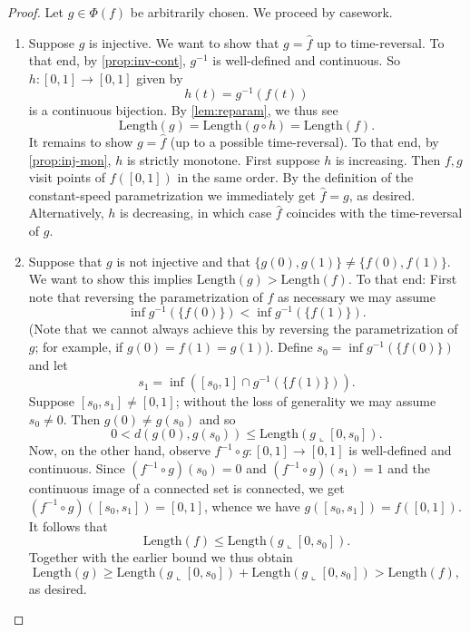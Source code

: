 \documentclass[aos, preprint]{imsart}
\theoremstyle{plain}
\theoremstyle{remark}
\begin{document}
\begin{appendix}
\begin{proof}
  Let $g \in \Phi(f)$ be arbitrarily chosen.
  We proceed
  by casework.
  \begin{enumerate}
    \item Suppose $g$ is injective. We want to show that $g = \hat{f}$ up to time-reversal. To
      that end, by \cref{prop:inv-cont}, $g^{-1}$ is well-defined and
      continuous. So $h : [0,1] \to [0,1]$ given by
      \[
      h(t) = g^{-1}(f(t))
      \]
      is a continuous bijection. By \cref{lem:reparam}, we thus see
      \[
      \mathrm{Length}(g) = \mathrm{Length}(g \circ h) =
      \mathrm{Length}(f).
      \]
      It remains to show $g = \hat{f}$ (up to a possible time-reversal). To
      that end, by \cref{prop:inj-mon}, $h$ is strictly monotone.
      First suppose $h$ is increasing. Then
      $f,g$ visit points of $f([0,1])$ in the same order. By the
      definition of the constant-speed parametrization we immediately get
      $\hat{f} = g$, as desired. Alternatively, $h$ is decreasing, in which case $\hat{f}$ coincides with the time-reversal of $g$.
    \item Suppose that $g$ is not injective and that $\{g(0), g(1)\}
      \neq \{f(0), f(1)\}$. We want to show this implies
      $\mathrm{Length}(g) > \mathrm{Length}(f)$. To that end: First
      note that reversing the parametrization of $f$  as
      necessary we may assume
      \[
      \inf g^{-1}(\{f(0)\}) < \inf g^{-1}(\{f(1)\}).
      \]
      (Note that we cannot always achieve this by reversing the
      parametrization of $g$; for example, if $g(0) = f(1) = g(1)$).
      Define $s_0 = \inf g^{-1}(\{f(0)\})$ and let
      \[
      s_1 = \inf([s_0, 1] \cap g^{-1}(\{f(1)\})).
      \]
      Suppose $[s_0, s_1] \neq [0,1]$; without the loss of generality
      we may assume $s_0 \neq 0$. Then $g(0) \neq g(s_0)$ and so
      \[
      0 < d(g(0), g(s_0)) \leq \mathrm{Length}(g\llcorner [0, s_0]).
      \]
      Now, on the other hand, observe $f^{-1} \circ g : [0,1] \to
      [0,1]$ is well-defined and continuous. Since $(f^{-1} \circ
      g)(s_0) = 0$ and $(f^{-1}\circ g)(s_1) = 1$ and the continuous
      image of a connected set is connected, we get $(f^{-1} \circ
      g)([s_0, s_1]) = [0,1]$, whence we have $g([s_0, s_1]) =
      f([0,1])$. It follows that
      \[
      \mathrm{Length}(f) \leq \mathrm{Length}(g\llcorner [0, s_0]).
      \]
      Together with the earlier bound we thus
      obtain $$\mathrm{Length}(g) \geq \mathrm{Length}(g\llcorner [0, s_0]) + \mathrm{Length}(g\llcorner [0, s_0]) >
      \mathrm{Length}(f),$$ as desired.

\end{enumerate}
\end{proof}
\end{appendix}
\end{document}
